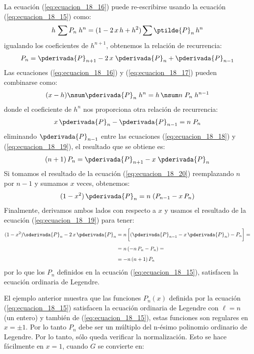 La ecuación (\ref{eq:ecuacion_18_16}) puede re-escribirse usando la ecuación (\ref{eq:ecuacion_18_15}) como:
\begin{align*}
h \, \sum P_{n} \; h^{n} =  (1 - 2 \, x \, h + h^{2}) \sum \ptilde{P}_{n} \, h^{n}
\end{align*}
igualando los coeficientes de $h^{n+1}$, obtenemos la relación de recurrencia:
\begin{align}
P_{n} = \pderivada{P}_{n+1} - 2 \, x \; \pderivada{P}_{n} + \pderivada{P}_{n-1}
\label{eq:ecuacion_18_18}
\end{align}
Las ecuaciones (\ref{eq:ecuacion_18_16}) y (\ref{eq:ecuacion_18_17}) pueden combinarse como:
\begin{align*}
(x - h) \nsum \pderivada{P}_{n} \; h^{n} = h \, \nsum n \; P_{n} \; h^{n-1}
\end{align*}
donde el coeficiente de $h^{n}$ nos proporciona otra relación de recurrencia:
\begin{align}
x \, \pderivada{P}_{n} - \pderivada{P}_{n-1} =  n \; P_{n}
\label{eq:ecuacion_18_19}
\end{align}
eliminando $\pderivada{P}_{n-1}$ entre las ecuaciones (\ref{eq:ecuacion_18_18}) y (\ref{eq:ecuacion_18_19}), el resultado que se obtiene es:
\begin{align}
(n + 1) \, P_{n} = \pderivada{P}_{n+1} - x \; \pderivada{P}_{n}
\label{eq:ecuacion_18_20}
\end{align}
Si tomamos el resultado de la ecuación (\ref{eq:ecuacion_18_20}) reemplazando $n$ por $n-1$ y sumamos $x$ veces, obtenemos:
\begin{equation}
(1 - x^{2}) \, \pderivada{P}_{n} = n \; (P_{n-1} - x \, P_{n})
\label{eq:ecuacion_18_21}
\end{equation}
Finalmente, derivamos ambos lados con respecto a $x$ y usamos el resultado de la ecuación (\ref{eq:ecuacion_18_19}) para tener:
\begin{align*}
(1 - x^{2}) \sderivada{P}_{n} - 2 \, x \, \pderivada{P}_{n} &= n \, \bigg[ (\pderivada{P}_{n-1} - x \, \pderivada{P}_{n}) - P_{n} \bigg] = \\[0.5em]
&= n \, (-n \, P_{n} - P_{n}) = \\[0.5em]
&= -n \, (n + 1) \, P_{n}
\end{align*}
por lo que los $P_{n}$ definidos en la ecuación (\ref{eq:ecuacion_18_15}), satisfacen la ecuación ordinaria de Legendre.
\par
El ejemplo anterior muestra que las funciones $P_{n} (x)$ definida por la ecuación (\ref{eq:ecuacion_18_15}) satisfacen la ecuación ordinaria de Legendre con $\ell = n$ (un entero) y también de (\ref{eq:ecuacion_18_15}), estas funciones son regulares en $x = \pm 1$. Por lo tanto $P_{n}$ debe ser un múltiplo del n-ésimo polinomio ordinario de Legendre. Por lo tanto, sólo queda verificar la normalización. Esto se hace fácilmente en $x = 1$, cuando $G$ se convierte en:

